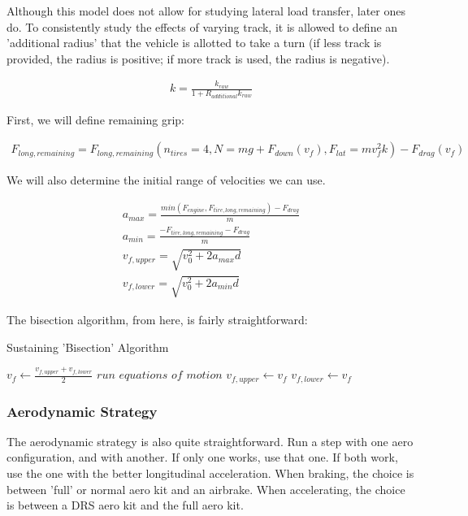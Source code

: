 \documentclass{article}
\begin{document}
Although this model does not allow for studying lateral load transfer, later ones do. To consistently study the effects of varying track, it is allowed to define an 'additional radius' that the vehicle is allotted to take a turn (if less track is provided, the radius is positive; if more track is used, the radius is negative).

\begin{align}
	k = \frac{k_{raw}}{1 + R_{additional} k_{raw}}
\end{align}

First, we will define remaining grip:

\begin{align}
	F_{long,remaining} = F_{long,remaining}(n_{tires} = 4, N = m g + F_{down}(v_f), F_{lat} = m v_f^2 k) - F_{drag}(v_f)
\end{align}

We will also determine the initial range of velocities we can use.

\begin{align}
	a_{max} = \frac{min(F_{engine},F_{tire,long,remaining})-F_{drag}}{m} \\
	a_{min} = \frac{-F_{tire,long,remaining}-F_{drag}}{m} \\
	v_{f,upper} = \sqrt{v_0^2 + 2 a_{max} d} \\
	v_{f,lower} = \sqrt{v_0^2 + 2 a_{min} d}
\end{align}

The bisection algorithm, from here, is fairly straightforward:

\begin{algorithm}[H]
\caption{Sustaining 'Bisection' Algorithm}
\begin{algorithmic}[1]
		\State $v_f \gets \frac{v_{f,upper}+v_{f,lower}}{2}$
		\State $run$ $equations$ $of$ $motion$
			\State $v_{f,upper} \gets v_{f}$
		\Else
			\State $v_{f,lower} \gets v_{f}$
		\EndIf
	\EndWhile
\end{algorithmic}
\end{algorithm}

\subsubsection{Aerodynamic Strategy}

The aerodynamic strategy is also quite straightforward. Run a step with one aero configuration, and with another. If only one works, use that one. If both work, use the one with the better longitudinal acceleration. When braking, the choice is between 'full' or normal aero kit and an airbrake. When accelerating, the choice is between a DRS aero kit and the full aero kit.
\end{document}

